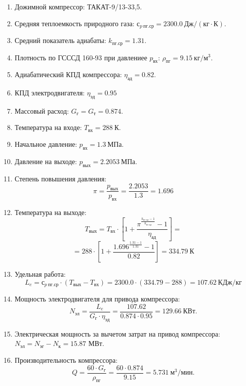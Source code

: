 \documentclass[a4paper,12pt]{article}
\begin{document}
%    
\begin{enumerate}
    \item Дожимной компрессор: ТАКАТ-9/13-33,5.
    \item Средняя теплоемкость природного газа: $с_{p\ пг.ср} = 2300.0\ Дж/(кг \cdot К) $.
    \item Средний показатель адиабаты: $k_{пг.ср} = 1.31$.
    \item Плотность по ГСССД 160-93 при давлениее $p_{вх}$: $\rho_{пг} = 9.15\ кг/м^3$.
    \item Адиабатический КПД компрессора: $\eta_{ад} = 0.82$.
    \item КПД электродвигателя: $\eta_{эд} = 0.95$
    \item Массовый расход: $G_{г} = G_{т} = 0.874$.
    \item Температура на входе: $T_{вх} = 288\ К$.
    \item Начальное давление: $p_{вх} = 1.3\ МПа$.
    \item Давление на выходе: $p_{вых} = 2.2053\ МПа$.
    \item Степень повышения давления:
    \[
        \pi = \frac{p_{вых}}{p_{вх}} = \frac{2.2053}
        {1.3} =
        1.696
    \]
    \item Температура на выходе:
    \[
        T_{вых} = T_{вх} \cdot \left[
                1 + \frac{
                        \pi^{\frac{k_{пг.ср} - 1}{k_{пг.ср}}} - 1
                    }{ \eta_{ад} }
        \right] =
    \]
    \[
        = 288 \cdot \left[
                1 + \frac{
                        1.696 ^
                        {\frac{1.31 - 1}{1.31}} - 1
                    }{ 0.82 }
        \right] =
        334.79\ К
    \]
    \item Удельная работа:
    \[
        L_e = с_{p\ пг.ср} \cdot ( T_{вых} - T_{вх} ) =
                2300.0 \cdot ( 334.79 - 288 ) =
        107.62\ КДж/кг
    \]
    \item Мощность электродвигателя для привода компрессора:
    \[
        N_{эл} = \frac{L_e}{G_{г} \cdot \eta_{эд}} =
        \frac{107.62}
        {0.874 \cdot 0.95 } =
        129.66\ КВт.
    \]
    \item Электрическая мощность за вычетом затрат на привод компрессора: $N_{эл} = N_{эг} - N_{к} = 15.87$ МВт.
    \item Производительность компрессора:
    \[
        Q = \frac{60 \cdot G_г}{\rho_{пг}} = \frac{60 \cdot 0.874}
        {9.15} = 5.731\ м^{3}/мин.
    \]
\end{enumerate}
\end{document}
